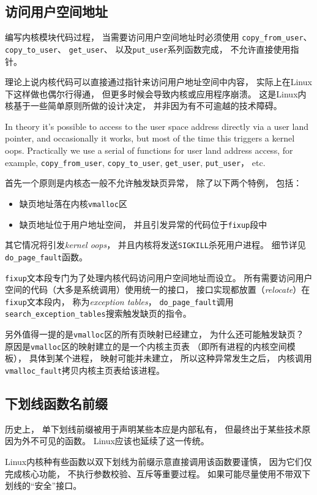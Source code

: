 \documentclass[11pt]{article}
\begin{document}
\subsection{访问用户空间地址}
编写内核模块代码过程，
当需要访问用户空间地址时必须使用%
\verb|copy_from_user|、
\verb|copy_to_user|、
\verb|get_user|、
以及\verb|put_user|系列函数完成，
不允许直接使用指针。

理论上说内核代码可以直接通过指针来访问用户地址空间中内容，
实际上在Linux下这样做也偶尔行得通，
但更多时候会导致内核或应用程序崩溃。
这是Linux内核基于一些简单原则所做的设计决定，
并非因为有不可逾越的技术障碍。

{\color{red}
In theory it's possible to access to the user space address
directly via a user land pointer,
and occasionally it works,
but most of the time this triggers a kernel oops.
Practically we use a serial of functions for user land address access,
for example,
\verb|copy_from_user|,
\verb|copy_to_user|,
\verb|get_user|,
\verb|put_user|，
etc.}

首先一个原则是内核态一般不允许触发缺页异常，
除了以下两个特例，
包括：
\begin{itemize}
  \item 缺页地址落在内核\verb|vmalloc|区
  \item 缺页地址位于用户地址空间，
  并且引发异常的代码位于\verb|fixup|段中
\end{itemize}
其它情况将引发{\em kernel oops}，
并且内核将发送\verb|SIGKILL|杀死用户进程。
细节详见\verb|do_page_fault|函数。

\verb|fixup|文本段专门为了处理内核代码访问用户空间地址而设立。
所有需要访问用户空间的代码（大多是系统调用）使用统一的接口，
接口实现都放置（{\em relocate}）在\verb|fixup|文本段内，
称为{\em exception tables}，
\verb|do_page_fault|调用\verb|search_exception_tables|搜索触发缺页的指令。

另外值得一提的是\verb|vmalloc|区的所有页映射已经建立，
为什么还可能触发缺页？
原因是\verb|vmalloc|区的映射建立的是一个内核主页表
（即所有进程的内核空间模板），
具体到某个进程，
映射可能并未建立，
所以这种异常发生之后，
内核调用\verb|vmalloc_fault|拷贝内核主页表给该进程。

\subsection{下划线函数名前缀}
历史上，
单下划线前缀被用于声明某些本应是内部私有，
但最终出于某些技术原因为外不可见的函数。
Linux应该也延续了这一传统。

Linux内核种有些函数以双下划线为前缀示意直接调用该函数要谨慎，
因为它们仅完成核心功能，
不执行参数校验、互斥等重要过程。
如果可能尽量使用不带双下划线的``安全''接口。
\end{document}
